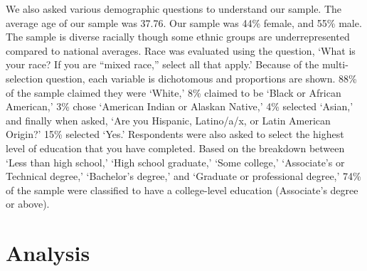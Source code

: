 We also asked various demographic questions to understand our sample. The
average age of our sample was 37.76. Our sample was 44\% female, and 55\% male. The sample is diverse racially though some ethnic groups are underrepresented compared to national averages. Race was evaluated using the
question, `What is your race? If you are ``mixed race,'' select all that apply.'
Because of the multi-selection question, each variable is dichotomous and
proportions are shown. 88\% of the sample claimed
they were `White,' 8\% claimed to be `Black or
African American,' 3\% chose `American Indian or
Alaskan Native,' 4\% selected `Asian,' and finally
when asked, `Are you Hispanic, Latino/a/x, or Latin American Origin?'
15\% selected `Yes.' Respondents were also asked to
select the highest level of education that you have completed. Based on the
breakdown between `Less than high school,' `High school graduate,' `Some college,'
`Associate's or Technical degree,' `Bachelor's degree,' and `Graduate or
professional degree,' 74\% of the sample were classified
to have a college-level education (Associate's degree or above).

\hypertarget{analysis}{%
\section{Analysis}\label{analysis}}

